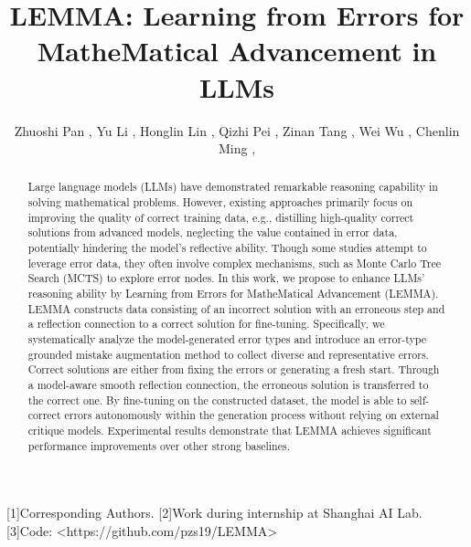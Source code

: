 \documentclass[sigconf]{acmart}\usepackage{booktabs}
\author{Zhuoshi Pan , Yu Li , Honglin Lin , Qizhi Pei , Zinan Tang , Wei Wu , Chenlin Ming ,}\affiliation{\institution{H. Vicky Zhao1, Conghui He2,*, Lijun Wu2,*}\country{}}
\begin{document}
\title{LEMMA: Learning from Errors for MatheMatical Advancement in LLMs}

\begin{abstract}
Large language models (LLMs) have demonstrated remarkable reasoning capability in solving mathematical problems. However, existing approaches primarily focus on improving the quality of correct training data, e.g., distilling high-quality correct solutions from advanced models, neglecting the value contained in error data, potentially hindering the model's reflective ability. Though some studies attempt to leverage error data, they often involve complex mechanisms, such as Monte Carlo Tree Search (MCTS) to explore error nodes. In this work, we propose to enhance LLMs' reasoning ability by Learning from Errors for MatheMatical Advancement (LEMMA). LEMMA constructs data consisting of an incorrect solution with an erroneous step and a reflection connection to a correct solution for fine-tuning. Specifically, we systematically analyze the model-generated error types and introduce an error-type grounded mistake augmentation method to collect diverse and representative errors. Correct solutions are either from fixing the errors or generating a fresh start. Through a model-aware smooth reflection connection, the erroneous solution is transferred to the correct one. By fine-tuning on the constructed dataset, the model is able to self-correct errors autonomously within the generation process without relying on external critique models. Experimental results demonstrate that LEMMA achieves significant performance improvements over other strong baselines.
\end{abstract}


\maketitle


[1]Corresponding Authors. [2]Work during internship at Shanghai AI Lab. [3]Code: <https://github.com/pzs19/LEMMA>
\end{document}
